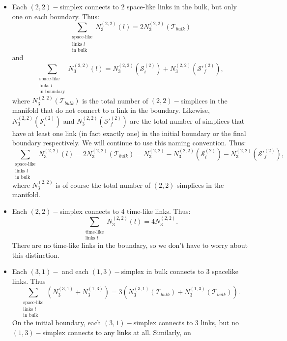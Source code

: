 \documentclass{article}
\begin{document}
\begin{itemize}
\item Each $(2,2)-$simplex connects to 2 space-like links in the bulk,
  but only one on each boundary. Thus:
  $$\sum_{\substack{\text{space-like}\\\text{links }l\\\text{in bulk}}} N_3^{(2,2)}(l) = 2 N_3^{(2,2)}(\mathcal{T}_{bulk})$$
  and
  $$\sum_{\substack{\text{space-like}\\\text{links }l\\\text{in boundary}}} N_3^{(2,2)}(l) = N_3^{(2,2)}(\mathcal{S}^{(2)}_i) + N_3^{(2,2)}(\mathcal{S}'^{(2)}_f),$$
  where $N_3^{(2,2)}(\mathcal{T}_{bulk})$ is the total number of
  $(2,2)-$simplices in the manifold that do not connect to a link in
  the boundary. Likewise, $N_3^{(2,2)}(\mathcal{S}^{(2)}_i)$ and
  $N_3^{(2,2)}(\mathcal{S}'^{(2)}_f)$ are the total number of simplices that
  have at least one link (in fact exactly one) in the initial boundary
  or the final boundary respectively. We will continue to use this
  naming convention. Thus:
  \begin{equation}
    \label{eq:22:SL}
      \sum_{\substack{\text{space-like}\\\text{links }l\\\text{in bulk}}} N_3^{(2,2)}(l) = 2 N_3^{(2,2)}(\mathcal{T}_{bulk}) = N_3^{(2,2)} - N_3^{(2,2)}(\mathcal{S}^{(2)}_i) - N_3^{(2,2)}(\mathcal{S}'^{(2)}_f),
  \end{equation}
  where $N_3^{(2,2)}$ is of course the total number of
  $(2,2)$-simplices in the manifold.
\item Each $(2,2)-$simplex connects to 4 time-like links. Thus:
  \begin{equation}
    \label{eq:22:tl}
    \sum_{\substack{\text{time-like}\\\text{links }l}}N_3^{(2,2)}(l) = 4N_3^{(2,2)}.
  \end{equation}
  There are no time-like links in the boundary, so we don't have to
  worry about this distinction.
\item Each $(3,1)-$ and each $(1,3)-$simplex in bulk connects to 3
  spacelike links. Thus
  $$\sum_{\substack{\text{space-like}\\\text{links }l\\\text{in bulk}}}\left(N_3^{(3,1)}+N_3^{(1,3)}\right) 
  = 3\left(N_3^{(3,1)}(\mathcal{T}_{bulk})+N_3^{(1,3)}(\mathcal{T}_{bulk})\right).$$
  On the initial boundary, each $(3,1)-$simplex connects to 3 links,
  but no $(1,3)-$simplex connects to any links at all. Similarly, on

\end{itemize}
\end{document}
